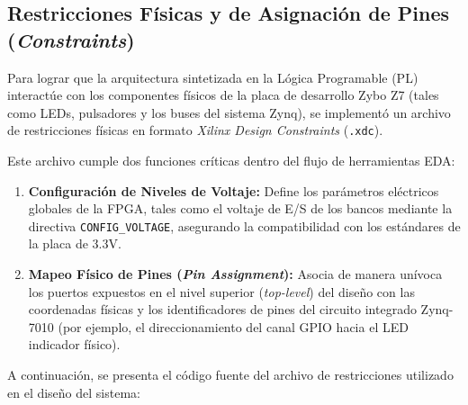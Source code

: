 \subsection{Restricciones Físicas y de Asignación de Pines (\textit{Constraints})}
Para lograr que la arquitectura sintetizada en la Lógica Programable (PL) interactúe con los componentes físicos de la placa de desarrollo Zybo Z7 (tales como LEDs, pulsadores y los buses del sistema Zynq), se implementó un archivo de restricciones físicas en formato \textit{Xilinx Design Constraints} (\texttt{.xdc}). 

Este archivo cumple dos funciones críticas dentro del flujo de herramientas EDA:
\begin{enumerate}
    \item \textbf{Configuración de Niveles de Voltaje:} Define los parámetros eléctricos globales de la FPGA, tales como el voltaje de E/S de los bancos mediante la directiva \texttt{CONFIG\_VOLTAGE}, asegurando la compatibilidad con los estándares de la placa de 3.3V.
    \item \textbf{Mapeo Físico de Pines (\textit{Pin Assignment}):} Asocia de manera unívoca los puertos expuestos en el nivel superior (\textit{top-level}) del diseño con las coordenadas físicas y los identificadores de pines del circuito integrado Zynq-7010 (por ejemplo, el direccionamiento del canal GPIO hacia el LED indicador físico).
\end{enumerate}

A continuación, se presenta el código fuente del archivo de restricciones utilizado en el diseño del sistema:
\pagebreak


